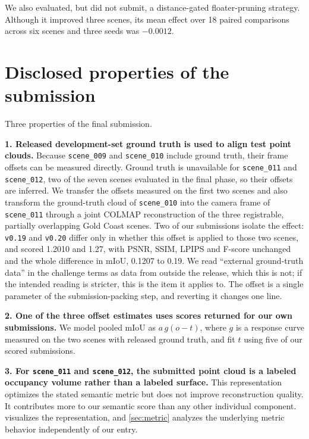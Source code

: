 \documentclass[10pt,twocolumn,letterpaper]{article}
\newcommand{\code}[1]{\texttt{\small #1}}
\begin{document}
We also evaluated, but did not submit, a distance-gated floater-pruning strategy.
Although it improved three scenes, its mean effect over 18 paired comparisons
across six scenes and three seeds was $-0.0012$.

\section{Disclosed properties of the submission}
\label{sec:disclosure}

Three properties of the final submission.

\textbf{1. Released development-set ground truth is used to align test point
clouds.} Because \code{scene\_009} and \code{scene\_010} include ground truth,
their frame offsets can be measured directly. Ground truth is unavailable for
\code{scene\_011} and \code{scene\_012}, two of the seven scenes evaluated in the
final phase, so their offsets are inferred. We transfer the offsets measured on
the first two scenes and also transform the ground-truth cloud of
\code{scene\_010} into the camera frame of \code{scene\_011} through a joint
COLMAP reconstruction of the three registrable, partially overlapping Gold Coast
scenes. Two of our submissions isolate the effect: \code{v0.19} and \code{v0.20} differ
only in whether this offset is applied to those two scenes, and scored 1.2010 and
1.27, with PSNR, SSIM, LPIPS and F-score unchanged and the whole difference in
mIoU, 0.1207 to 0.19. We read ``external ground-truth data'' in the challenge
terms as data from outside the release, which this is not; if the intended
reading is stricter, this is the item it applies to. The offset is a single
parameter of the
submission-packing step, and reverting it changes one line.

\textbf{2. One of the three offset estimates uses scores returned for our own
submissions.} We model pooled mIoU as $a\,g(o-t)$, where $g$ is a response curve
measured on the two scenes with released ground truth, and fit $t$ using five of
our scored submissions.

\textbf{3. For \code{scene\_011} and \code{scene\_012}, the submitted point cloud
is a labeled occupancy volume rather than a labeled surface.} This representation
optimizes the stated semantic metric but does not improve reconstruction quality.
It contributes more to our semantic score than any other individual component.
 visualizes the representation, and \cref{sec:metric} analyzes
the underlying metric behavior independently of our entry.
\end{document}
